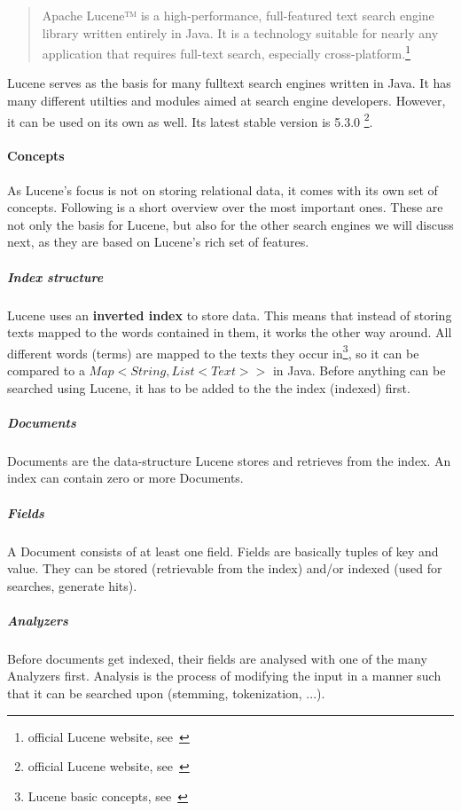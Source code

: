 \begin{quote}
	Apache Lucene™ is a high-performance, full-featured text search engine library written entirely in Java. It is a technology suitable for nearly any application that requires full-text search, especially cross-platform.\footnote{official Lucene website, see~\cite{lucene_apache_org}}
\end{quote}
Lucene serves as the basis for many fulltext search engines written in Java. It has many different utilties and modules aimed at search engine developers. However, it can be used on its own as well. Its latest stable version is 5.3.0 \footnote{official Lucene website, see~\cite{lucene_apache_org}}.

\paragraph{Concepts}

As Lucene's focus is not on storing relational data, it comes with its own set of concepts. Following is a short overview over the most important ones. These are not only the basis for Lucene, but also for the other search engines we will discuss next, as they are based on Lucene's rich set of features.

\subparagraph{Index structure}
Lucene uses an \textbf{inverted index} to store data. This means that instead of storing texts mapped to the words contained in them, it works the other way around. All different words (terms) are mapped to the texts they occur in\footnote{Lucene basic concepts, see~\cite{lucene_basic_concepts}}, so it can be compared to a \(Map<String, List<Text>>\) in Java. Before anything can be searched using Lucene, it has to be added to the the index (indexed) first.

\subparagraph{Documents}
Documents are the data-structure Lucene stores and retrieves from the index. An index can contain zero or more Documents.

\subparagraph{Fields}
A Document consists of at least one field. Fields are basically tuples of key and value. They can be stored (retrievable from the index) and/or indexed (used for searches, generate hits).

\subparagraph{Analyzers}
Before documents get indexed, their fields are analysed with one of the many Analyzers first. Analysis is the process of modifying the input in a manner such that it can be searched upon (stemming, tokenization, ...).

\pagebreak

